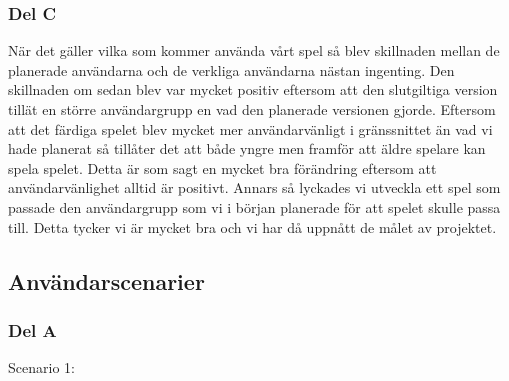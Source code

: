 \documentclass[10pt,a4paper]{article}
\begin{document}
\subsubsection*{Del C}

När det gäller vilka som kommer använda vårt spel så blev skillnaden mellan de planerade användarna och de verkliga användarna nästan ingenting. Den skillnaden om sedan blev var mycket positiv eftersom att den slutgiltiga version tillät en större användargrupp en vad den planerade versionen gjorde. Eftersom att det färdiga spelet blev mycket mer användarvänligt i gränssnittet än vad vi hade planerat så tillåter det att både yngre men framför att äldre spelare kan spela spelet. Detta är som sagt en mycket bra förändring eftersom att användarvänlighet alltid är positivt. Annars så lyckades vi utveckla ett spel som passade den användargrupp som vi i början planerade för att spelet skulle passa till. Detta tycker vi är mycket bra och vi har då uppnått de målet av projektet.

\subsection*{Användarscenarier}

\subsubsection*{Del A}

Scenario 1:
\end{document}
